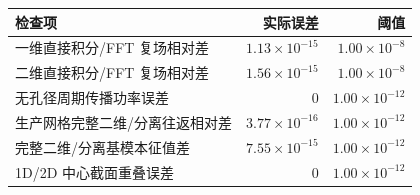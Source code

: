 \begin{tabular}{lrr}\toprule
检查项 & 实际误差 & 阈值\\\midrule
一维直接积分/FFT 复场相对差 & \(1.13\times10^{-15}\) & \(1.00\times10^{-8}\)\\
二维直接积分/FFT 复场相对差 & \(1.56\times10^{-15}\) & \(1.00\times10^{-8}\)\\
无孔径周期传播功率误差 & \(0\) & \(1.00\times10^{-12}\)\\
生产网格完整二维/分离往返相对差 & \(3.77\times10^{-16}\) & \(1.00\times10^{-12}\)\\
完整二维/分离基模本征值差 & \(7.55\times10^{-15}\) & \(1.00\times10^{-12}\)\\
1D/2D 中心截面重叠误差 & \(0\) & \(1.00\times10^{-12}\)\\
\bottomrule\end{tabular}